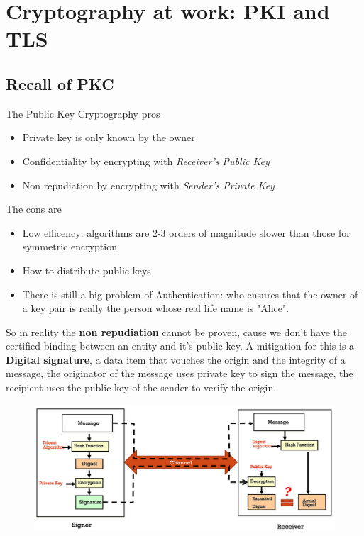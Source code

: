 \section{Cryptography at work: PKI and TLS}
    \subsection{Recall of PKC}
    The Public Key Cryptography pros
    \begin{itemize}
        \item Private key is only known by the owner
        \item Confidentiality by encrypting with \textit{Receiver's Public Key}
        \item Non repudiation by encrypting with \textit{Sender's Private Key}
    \end{itemize}
    The cons are
    \begin{itemize}
        \item Low efficency: algorithms are 2-3 orders of magnitude slower than those for symmetric encryption
        \item How to distribute public keys
        \item There is still a big problem of Authentication: who ensures that the owner of a key pair is really the person whose real life name is "Alice".
    \end{itemize}  
    So in reality the \textbf{non repudiation} cannot be proven, cause we don't have the certified binding between an entity and it's public key. A mitigation for this is a \textbf{Digital signature}, a data item that vouches the origin and the integrity of a message, the originator of the message uses private key to sign the message, the recipient uses the public key of the sender to verify the origin. 
    
    \begin{figure}[h!]
        \centering
        \includegraphics[scale=0.3]{images/PKCcomm.png}
    \end{figure}
    
